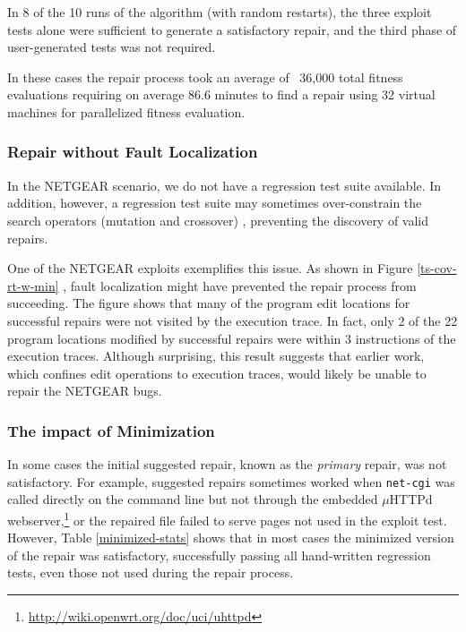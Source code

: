 \documentclass{sigcomm-alternate}
\begin{document}
In 8 of the 10 runs of the algorithm (with random restarts), the three exploit tests alone were
sufficient to generate a satisfactory repair, and the third phase of
user-generated tests was not required.  

In these cases the repair process took an average of ~36,000 total fitness
evaluations requiring on average 86.6 minutes to find a repair using 32
virtual machines for parallelized fitness evaluation.

\subsubsection{Repair without Fault Localization}
\label{no-fault-localization}

In the NETGEAR scenario, we do not have a regression test suite available.
In addition, however, a regression test suite may sometimes
over-constrain the search operators (mutation and crossover)
\cite{schulte2013optimization}, preventing the discovery of valid
repairs.

One of the NETGEAR exploits exemplifies this issue.  As shown in
Figure \ref{ts-cov-rt-w-min} , fault localization might have prevented
the repair process from succeeding.  The figure shows that many of the
program edit locations for successful repairs were not visited by the
execution trace.  In fact, only 2 of the 22 program locations modified
by successful repairs were within 3 instructions of the execution
traces.  Although surprising, this result suggests that earlier work,
which confines edit operations to execution traces, would likely be
unable to repair the NETGEAR bugs.

\subsubsection{The impact of Minimization}
\label{minimization}

In some cases the initial suggested repair, known as the
\emph{primary} repair, was not satisfactory.  For
example, suggested repairs sometimes worked when \texttt{net-cgi} was
called directly on the command line but not through the embedded
$\mu$HTTPd webserver,\footnote{\url{http://wiki.openwrt.org/doc/uci/uhttpd}}
or the repaired file failed to serve pages not used in the
exploit test.  However, Table \ref{minimized-stats} shows that in most
cases the minimized version of the repair was satisfactory,
successfully passing all hand-written regression tests, even those not used
during the repair process. 
\end{document}
